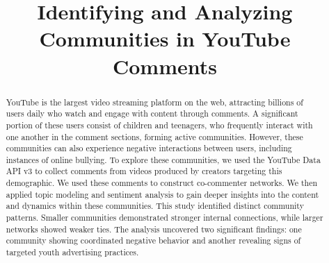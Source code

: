\documentclass[sigconf]{acmart}
\newcommand{\humberto}[1]{{\color{red}[HTMN: #1]}}
\begin{document}
\title{Identifying and Analyzing Communities in YouTube Comments}






\begin{abstract}
    YouTube is the largest video streaming platform on the web, attracting billions of users daily who watch and engage with content through comments. 
    A significant portion of these users consist of children and teenagers, who frequently interact with one another in the comment sections, forming active communities. 
    However, these communities can also experience negative interactions between users, 
    including instances of online bullying.
    To explore these communities, we used the YouTube Data API v3 to collect comments 
    from videos produced by creators targeting this demographic. We used these comments to construct co-commenter networks.
    We then applied topic modeling and sentiment analysis to gain deeper insights into the  
    content and dynamics within these communities.
    This study identified distinct community patterns. Smaller communities 
    demonstrated stronger internal connections, while larger networks showed weaker ties. The analysis uncovered two significant findings: one community showing coordinated negative behavior and another revealing signs of targeted youth advertising practices.
\end{abstract}
\end{document}
